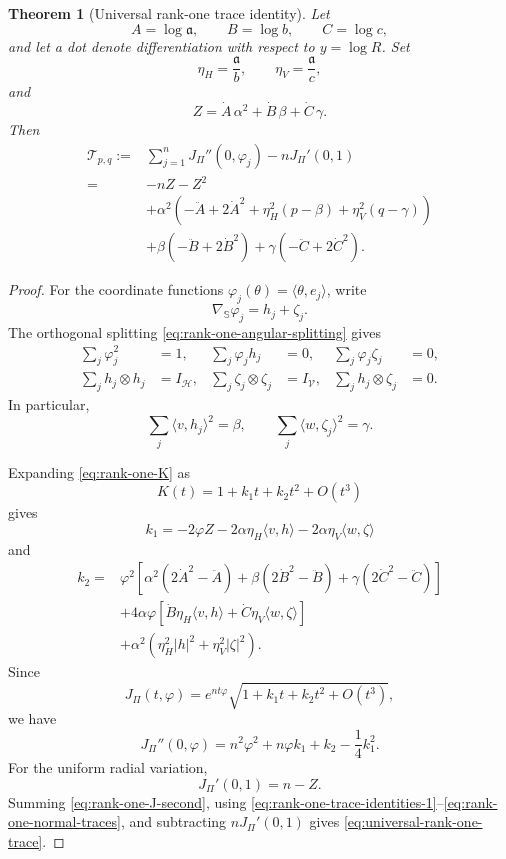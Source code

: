 \documentclass[11pt,reqno]{amsart}
\numberwithin{equation}{section}
\newtheorem{theorem}{Theorem}[section]
\theoremstyle{definition}
\theoremstyle{remark}
\begin{document}
\begin{theorem}[Universal rank-one trace identity]
\label{thm:universal-rank-one-trace}
Let
\[
A=\log\mathfrak a,
\qquad
B=\log b,
\qquad
C=\log c,
\]
and let a dot denote differentiation with respect to $y=\log R$.  Set
\[
\eta_H=\frac{\mathfrak a}{b},
\qquad
\eta_V=\frac{\mathfrak a}{c},
\]
and
\[
Z
=
\dot A\,\alpha^2
+
\dot B\,\beta
+
\dot C\,\gamma.
\]
Then
\begin{equation}
\begin{aligned}
\mathscr T_{p,q}
:={}&
\sum_{j=1}^nJ_\Pi''(0,\varphi_j)
-nJ_\Pi'(0,1)
\\
={}&
-nZ-Z^2
\\
&+
\alpha^2
\left(
-\ddot A+2\dot A^2
+\eta_H^2(p-\beta)
+\eta_V^2(q-\gamma)
\right)
\\
&+
\beta(-\ddot B+2\dot B^2)
+
\gamma(-\ddot C+2\dot C^2).
\end{aligned}
\label{eq:universal-rank-one-trace}
\end{equation}
\end{theorem}

\begin{proof}
For the coordinate functions
$\varphi_j(\theta)=\langle\theta,e_j\rangle$, write
\[
\nabla_{\mathbb S}\varphi_j=h_j+\zeta_j.
\]
The orthogonal splitting \eqref{eq:rank-one-angular-splitting} gives
\begin{align}
\sum_j\varphi_j^2&=1,
&
\sum_j\varphi_jh_j&=0,
&
\sum_j\varphi_j\zeta_j&=0,
\label{eq:rank-one-trace-identities-1}
\\
\sum_jh_j\otimes h_j&=I_{\mathcal H},
&
\sum_j\zeta_j\otimes\zeta_j&=I_{\mathcal V},
&
\sum_jh_j\otimes\zeta_j&=0.
\label{eq:rank-one-trace-identities-2}
\end{align}
In particular,
\begin{equation}
\sum_j\langle v,h_j\rangle^2=\beta,
\qquad
\sum_j\langle w,\zeta_j\rangle^2=\gamma.
\label{eq:rank-one-normal-traces}
\end{equation}

Expanding \eqref{eq:rank-one-K} as
\[
K(t)=1+k_1t+k_2t^2+O(t^3)
\]
gives
\[
k_1
=
-2\varphi Z
-2\alpha\eta_H\langle v,h\rangle
-2\alpha\eta_V\langle w,\zeta\rangle
\]
and
\begin{align}
k_2
={}&
\varphi^2
\left[
\alpha^2(2\dot A^2-\ddot A)
+\beta(2\dot B^2-\ddot B)
+\gamma(2\dot C^2-\ddot C)
\right]
\nonumber\\
&+
4\alpha\varphi
\left[
\dot B\eta_H\langle v,h\rangle
+\dot C\eta_V\langle w,\zeta\rangle
\right]
\nonumber\\
&+
\alpha^2
\left(
\eta_H^2|h|^2
+\eta_V^2|\zeta|^2
\right).
\label{eq:rank-one-k2}
\end{align}
Since
\[
J_\Pi(t,\varphi)
=
e^{nt\varphi}
\sqrt{1+k_1t+k_2t^2+O(t^3)},
\]
we have
\begin{equation}
J_\Pi''(0,\varphi)
=
n^2\varphi^2+n\varphi k_1+k_2-\frac{1}{4}k_1^2.
\label{eq:rank-one-J-second}
\end{equation}
For the uniform radial variation,
\[
J_\Pi'(0,1)=n-Z.
\]
Summing \eqref{eq:rank-one-J-second}, using
\eqref{eq:rank-one-trace-identities-1}--\eqref{eq:rank-one-normal-traces}, and
subtracting $nJ_\Pi'(0,1)$ gives
\eqref{eq:universal-rank-one-trace}.
\end{proof}
\end{document}
